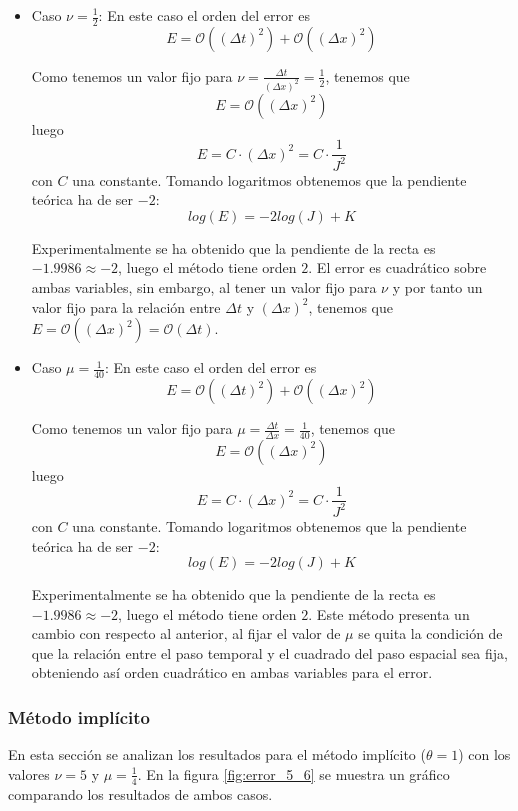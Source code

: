 \documentclass[spanish]{mathnotes}
\begin{document}
	\begin{itemize}
		\item Caso $\nu = \frac{1}{2}$: En este caso el orden del error es
		$$E = \mathcal{O}((\Delta t)^2) + \mathcal{O}((\Delta x)^2)$$
		
		Como tenemos un valor fijo para $\nu=\frac{\Delta t}{(\Delta x)^2}=\frac{1}{2}$, tenemos que 
		$$E = \mathcal{O}((\Delta x)^2)$$
		luego 
		$$E = C\cdot (\Delta x)^2 = C\cdot\frac{1}{J^2}$$ 
		con $C$ una constante. Tomando logaritmos obtenemos que la pendiente teórica ha de ser $-2$:
		$$log(E) = -2log(J) + K$$
		
		Experimentalmente se ha obtenido que la pendiente de la recta es $-1.9986\approx -2$, luego el método tiene orden $2$.  El error es cuadrático sobre ambas variables, sin embargo, al tener un valor fijo para $\nu$ y por tanto un valor fijo para la relación entre $\Delta t$ y $(\Delta x)^2$, tenemos que $E = \mathcal{O}((\Delta x)^2) = \mathcal{O}(\Delta t)$.
		
		\item Caso $\mu = \frac{1}{40}$: En este caso el orden del error es
		$$E = \mathcal{O}((\Delta t)^2) + \mathcal{O}((\Delta x)^2)$$
		
		Como tenemos un valor fijo para $\mu=\frac{\Delta t}{\Delta x}=\frac{1}{40}$, tenemos que 
		$$E = \mathcal{O}((\Delta x)^2)$$
		luego 
		$$E = C\cdot (\Delta x)^2 = C\cdot\frac{1}{J^2}$$ 
		con $C$ una constante. Tomando logaritmos obtenemos que la pendiente teórica ha de ser $-2$:
		$$log(E) = -2log(J) + K$$
		
		Experimentalmente se ha obtenido que la pendiente de la recta es $-1.9986\approx -2$, luego el método tiene orden $2$. Este método presenta un cambio con respecto al anterior, al fijar el valor de $\mu$ se quita la condición de que la relación entre el paso temporal y el cuadrado del paso espacial sea fija, obteniendo así orden cuadrático en ambas variables para el error.
	\end{itemize}
	
	\subsubsection{Método implícito}
	En esta sección se analizan los resultados para el método implícito ($\theta = 1$) con los valores $\nu=5$ y $\mu=\frac{1}{4}$. En la figura \ref{fig:error_5_6} se muestra un gráfico comparando los resultados de ambos casos.
	
	
\end{document}
